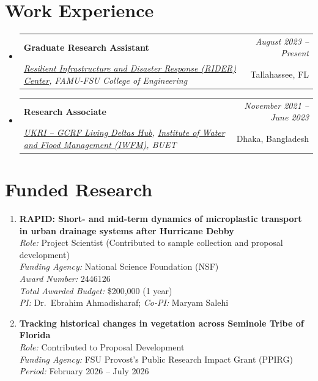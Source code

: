 \documentclass[a4paper,11pt]{article}
\makeatletter
\newcommand{\resumeSubheading}[4]{
\vspace{0.5mm}\item
    \begin{tabular*}{0.98\textwidth}[t]{l@{\extracolsep{\fill}}r}
        \textbf{#1} & \textit{\footnotesize{#4}} \\
        \textit{\footnotesize{#3}} &  \footnotesize{#2}\\
    \end{tabular*}
    \vspace{-2.4mm}
}
\newcommand{\resumeSubHeadingListStart}{\begin{itemize}[leftmargin=*,labelsep=1mm]}
\newcommand{\resumeSubHeadingListEnd}{\end{itemize}\vspace{2mm}}
\makeatother
\begin{document}
\section{\textbf{Work Experience}}
\vspace{-0.4mm}
\resumeSubHeadingListStart
\resumeSubheading
{Graduate Research Assistant}{Tallahassee, FL}
{\href{https://rider.eng.famu.fsu.edu/}{Resilient Infrastructure and Disaster Response (RIDER) Center}, FAMU-FSU College of Engineering}{August 2023 -- Present}
\resumeSubheading
{Research Associate}{Dhaka, Bangladesh}
{\href{https://livingdeltas.org/}{UKRI -- GCRF Living Deltas Hub}, \href{https://iwfm.buet.ac.bd/site/}{Institute of Water and Flood Management (IWFM)}, BUET}{November 2021 -- June 2023}
\resumeSubHeadingListEnd
\vspace{-6mm}

\section{\textbf{Funded Research}}
\vspace{1mm}
\small{
\begin{enumerate}[leftmargin=*, labelsep=0.5em, itemsep=4mm]

\item \textbf{RAPID: Short- and mid-term dynamics of microplastic transport in urban drainage systems after Hurricane Debby}\\
\textit{Role:} Project Scientist (Contributed to sample collection and proposal development)\\
\textit{Funding Agency:} National Science Foundation (NSF)\\
\textit{Award Number:} 2446126\\
\textit{Total Awarded Budget:} \$200,000 (1 year)\\
\textit{PI:} Dr.\ Ebrahim Ahmadisharaf; \textit{Co-PI:} Maryam Salehi

\item \textbf{Tracking historical changes in vegetation across Seminole Tribe of Florida}\\
\textit{Role:} Contributed to Proposal Development\\
\textit{Funding Agency:} FSU Provost's Public Research Impact Grant (PPIRG)\\
\textit{Period:} February 2026 -- July 2026

\end{enumerate}
}
\vspace{-2mm}
\end{document}
